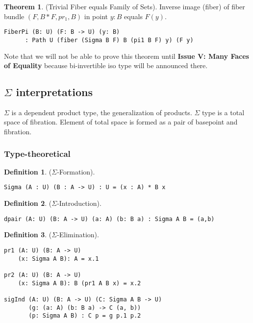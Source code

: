 \documentclass{article}
\theoremstyle{definition}
\newtheorem{theorem}{Theorem}
\newtheorem{definition}{Definition}
\begin{document}
\begin{theorem} (Trivial Fiber equals Family of Sets).
Inverse image (fiber) of fiber bundle $(F,B*F,pr_1,B)$ in point $y:B$ equals $F(y)$.
\begin{lstlisting}
FiberPi (B: U) (F: B -> U) (y: B)
      : Path U (fiber (Sigma B F) B (pi1 B F) y) (F y)
\end{lstlisting}
\end{theorem}

Note that we will not be able to prove this theorem
until {\bf Issue V: Many Faces of Equality} because
bi-invertible iso type will be announced there.

\subsection{$\Sigma$ interpretations}

$\Sigma$ is a dependent product type, the generalization of products.
$\Sigma$ type is a total space of fibration. Element of total
space is formed as a pair of basepoint and fibration.

\subsubsection{Type-theoretical}

\begin{definition} ($\Sigma$-Formation).
\begin{lstlisting}
Sigma (A : U) (B : A -> U) : U = (x : A) * B x
\end{lstlisting}
\end{definition}

\begin{definition} ($\Sigma$-Introduction).
\begin{lstlisting}
dpair (A: U) (B: A -> U) (a: A) (b: B a) : Sigma A B = (a,b)
\end{lstlisting}
\end{definition}

\begin{definition} ($\Sigma$-Elimination).
\begin{lstlisting}
pr1 (A: U) (B: A -> U)
    (x: Sigma A B): A = x.1

pr2 (A: U) (B: A -> U)
    (x: Sigma A B): B (pr1 A B x) = x.2

sigInd (A: U) (B: A -> U) (C: Sigma A B -> U)
       (g: (a: A) (b: B a) -> C (a, b))
       (p: Sigma A B) : C p = g p.1 p.2
\end{lstlisting}
\end{definition}
\end{document}
